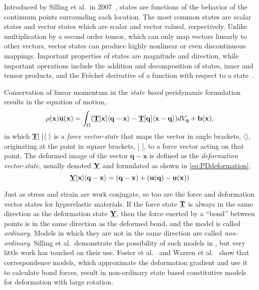 \documentclass[5p,twocolumn]{elsarticle}
\newcommand\vstate[3]{%
	\mathbf{\underline{#1}}%
	\ifstrempty{#2}{}{[#2]}%
	\ifstrempty{#3}{}{\langle #3 \rangle}}
\begin{document}
Introduced by Silling et al.\ in 2007~\cite{silling2007peridynamic}, states are functions of the behavior of the continuum points surrounding each location.
The most common states are scalar states and vector states which are scalar and vector valued, respectively.
Unlike multiplication by a second order tensor, which can only map vectors linearly to other vectors, vector states can produce highly nonlinear or even discontinuous mappings.
Important properties of states are magnitude and direction, while important operations include the addition and decomposition of states, inner and tensor products, and the Fr\'{e}chet derivative of a function with respect to a state~\cite{silling2007peridynamic}.

Conservation of linear momentum in the \textit{state based} peridynamic formulation results in the equation of motion,
%
\begin{equation}
\label{eq:PDstateEoM}
\rho(\mathbf{x})\ddot{\mathbf{u}}(\mathbf{x}) = \int_\Omega (\vstate{T}{\mathbf{x}}{\mathbf{q}-\mathbf{x}}-\vstate{T}{\mathbf{q}}{\mathbf{x}-\mathbf{q}}) dV_\mathbf{q}  + \mathbf{b}(\mathbf{x}),\notag
\end{equation}
%
in which $\vstate{T}{\;}{\;}$ is a \textit{force vector-state} that maps the vector in angle brackets, $\langle \rangle$, originating at the point in square brackets, [ ], to a force vector acting on that point.
The deformed image of the vector $\mathbf{q}-\mathbf{x}$ is defined as the \textit{deformation vector-state}, usually denoted $\vstate{Y}{}{}$ and formulated as shown in \cref{eq:PDdeformation}. 
%
\begin{equation}
\label{eq:PDdeformation}
\vstate{Y}{\mathbf{x}}{\mathbf{q}-\mathbf{x}} = (\mathbf{q}-\mathbf{x}) + (\mathbf{u}(\mathbf{q})-\mathbf{u}(\mathbf{x}))
\end{equation}
%

Just as stress and strain are work conjugate, so too are the force and deformation vector states for hyperelastic materials.
If the force state $\vstate{T}{}{}$ is always in the same direction as the deformation state $\vstate{Y}{}{}$, then the force exerted by a ``bond'' between points is in the same direction as the deformed bond, and the model is called \textit{ordinary}.  
Models in which they are not in the same direction are called \textit{non-ordinary}.
Silling et al.\ demonstrate the possibility of such models in \cite{silling2010peridynamic}, but very little work has touched on their use.
Foster et al.\ \cite{foster2010viscoplasticity} and Warren et al.\ \cite{warren2009non} show that correspondence models, which approximate the deformation gradient and use it to calculate bond forces, result in non-ordinary state based constitutive models for deformation with large rotation.
%
\FloatBarrier
%
\end{document}
